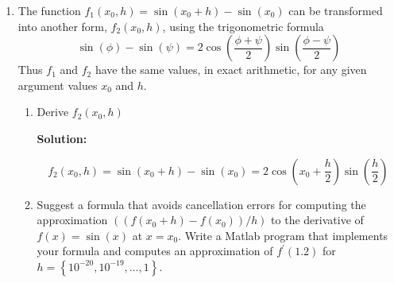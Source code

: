 \documentclass[12pt]{article}
\DeclareMathOperator{\sech}{sech}
\begin{document}
\begin{enumerate}
which for the instance of this problem gives us

\begin{align*}
  g(x) &= \frac{e^{cx} - e^{-cx}}{e^{cx}+e^{-cx}} = \frac{\frac{e^{cx}-e^{-cx}}{2}}{\frac{e^{cx}+e^{-cx}}{2}}\\
        &= \frac{\sinh(x)}{\cosh(x)}\\
  g^{\prime}(x) &= c \sech^{2}(cx)\\
                &= \frac{c}{\cosh^{2}(cx)}
\end{align*}

with using these formulas, we can plug it into the definition of the condition
number we get

\begin{align*}
\text{Condition Number}(g) &= x\frac{g^{\prime}(x)}{g(x)} = \frac{cx}{\cosh^{2}(x)\cdot \tanh(cx)}\\
                            &= cx\frac{\cosh(cx)}{\sinh(cx)} = cx\cdot \coth(cx)
\intertext{Where we can take the limit of the condition number as $x$ approaches $0$, giving}
\lim_{x\rightarrow 0} cx\cdot \coth(cx) &= 1
\end{align*}

This shows that the funcion's sensitivity is not dependent upon $c$ and is well conditioned.


\item The function $f_{1}\left(x_{0},h\right) = \sin\left(x_{0}+h\right) - \sin\left(x_{0}\right)$
can be transformed into another form, $f_{2}\left(x_{0},h\right)$, using the
trigonometric formula
\[
\sin(\phi) - \sin(\psi) = 2\cos\left(\frac{\phi + \psi}{2}\right)\sin\left(\frac{\phi - \psi}{2}\right)
\]
Thus $f_{1}$ and $f_{2}$ have the same values, in exact arithmetic, for any given
argument values $x_{0}$ and $h$.
\begin{enumerate}
\item Derive $f_{2}\left(x_{0},h\right)$

{\bf Solution:}

\[
f_{2}\left(x_{0},h\right) = \sin\left(x_{0} + h\right) - \sin\left(x_{0}\right) = 2\cos\left(x_{0} + \frac{h}{2}\right)\sin\left(\frac{h}{2}\right)
\]
\item Suggest a formula that avoids cancellation errors for computing the approximation
$\left(\left( f\left( x_{0}+h\right) - f\left(x_{0}\right)\right) /h\right)$
to the derivative of $f(x)=\sin(x)$ at $x=x_{0}$. Write a {\sc Matlab} program
that implements your formula and computes an approximation of $f^{\prime}(1.2)$
for $h = \left\{ 10^{-20},10^{-19},\ldots,1\right\}$.


\end{enumerate}
\end{enumerate}
\end{document}
